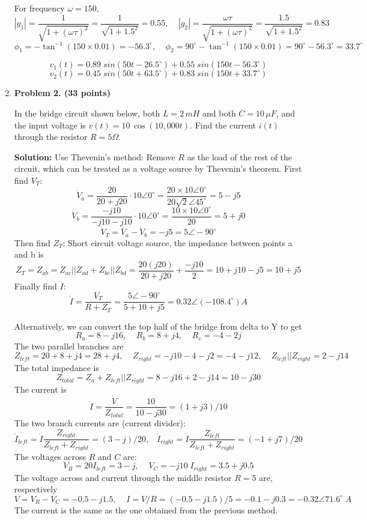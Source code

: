 \begin{enumerate}
For frequency $\omega=150$, 
\[ |g_1|=\frac{1}{\sqrt{1+(\omega \tau)^2}}=\frac{1}{\sqrt{1+1.5^2}}=0.55,\;\;\;\;
|g_2|=\frac{\omega \tau}{\sqrt{1+(\omega \tau)^2}}=\frac{1.5}{\sqrt{1+1.5^2}}=0.83 \]
\[ \phi_1=-\tan^{-1}(150\times 0.01)=-56.3^\circ,\;\;\;\;
   \phi_2=90^\circ-\tan^{-1}(150\times 0.01)=90^\circ-56.3^\circ=33.7^\circ \]

\[ v_1(t)=0.89\; sin(50 t-26.5^\circ)+0.55\;sin(150 t-56.3^\circ) \]
\[ v_2(t)=0.45\; sin(50 t+63.5^\circ)+0.83\;sin(150 t+33.7^\circ) \]


\item {\bf Problem 2. (33 points)} 

In the bridge circuit shown below, both $L=2\,mH$ and both $C=10\,\mu F$,
and the input voltage is $v(t)=10\,\cos(10,000 t)$. Find the current $i(t)$ 
through the resistor $R=5\Omega$.


{\bf Solution:}
Use Thevenin's method:
Remove $R$ as the load of the rest of the circuit, which can be treated 
as a voltage source by Thevenin's theorem. First find $\dot{V}_T$:
\[	\dot{V}_a=\frac{20}{20+j20}\cdot 10\angle 0^\circ
	=\frac{20\times 10\angle 0^\circ}{20\sqrt{2} \angle 45^\circ}
	=5-j5
\]
\[	\dot{V}_b=\frac{-j10}{-j10-j10}\cdot 10\angle 0^\circ
	=\frac{10\times 10\angle 0^\circ}{20}=5+j0	\]
\[	\dot{V}_T=\dot{V_a}-\dot{V}_b=-j5=5\angle -90^\circ	\]
Then find $Z_T$:
Short circuit voltage source, the impedance between points a and b is
\[ Z_T=Z_{ab}=Z_{ac}||Z_{ad}+Z_{bc}||Z_{bd}=\frac{20(j20)}{20+j20}+\frac{-j10}{2} 
	=10+j10-j5=10+j5 \]
Finally find $\dot{I}$:
\[ \dot{I}=\frac{V_T}{R+Z_T}=\frac{5\angle -90^\circ}{5+10+j5}
	=0.32\angle (-108.4^\circ) A \]

Alternatively, we can convert the top half of the bridge from delta to Y 
to get 
\[ 
R_a=8-j16,\;\;\;\;R_b=8+j4,\;\;\;\;R_c=-4-2j  
\]
The two parallel branches are
\[  Z_{left}=20+8+j4=28+j4,\;\;\;\;Z_{right}=-j10-4-j2=-4-j12,\;\;\;\;
    Z_{left} || Z_{right}=2-j14 \]
The total impedance is
\[ Z_{total}=Z_a+Z_{left} || Z_{right}=8-j16+2-j14=10-j30 \]
The current is
\[ \dot{I}=\frac{\dot{V}}{Z_{total}}=\frac{10}{10-j30}=(1+j3)/10 \]
The two branch currents are (current divider):
\[ \dot{I}_{left}=\dot{I}\frac{Z_{right}}{Z_{left}+Z_{right}}=(3-j)/20,\;\;\;
   \dot{I}_{right}=\dot{I}\frac{Z_{left}}{Z_{left}+Z_{right}}=(-1+j7)/20  \]
The voltages across $R$ and $C$ are:
\[ V_R=20 I_{left}= 3-j,\;\;\;\; V_C=-j10 \; I_{right}=3.5+j0.5 \]
The voltage across and current through the middle resistor $R=5$ are, respectively
\[ V=V_R-V_C=-0.5-j1.5,\;\;\;\;
  I=V/R=(-0.5-j1.5)/5=-0.1-j0.3=-0.32 \angle 71.6^\circ \; A \]
The current is the same as the one obtained from the previous method.



\end{enumerate}
